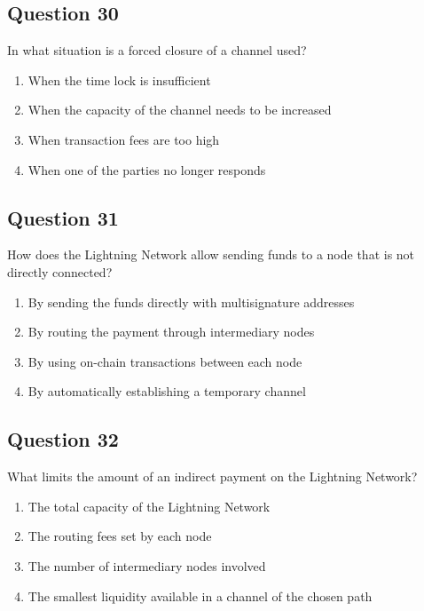 \documentclass[12pt,a4paper]{article}
\begin{document}
\subsection*{Question 30}
In what situation is a forced closure of a channel used?

\begin{enumerate}[label=\Alph*., leftmargin=*]
\item When the time lock is insufficient
\item When the capacity of the channel needs to be increased
\item When transaction fees are too high
\item When one of the parties no longer responds
\end{enumerate}

\bigskip


\subsection*{Question 31}
How does the Lightning Network allow sending funds to a node that is not directly connected?

\begin{enumerate}[label=\Alph*., leftmargin=*]
\item By sending the funds directly with multisignature addresses
\item By routing the payment through intermediary nodes
\item By using on-chain transactions between each node
\item By automatically establishing a temporary channel
\end{enumerate}

\bigskip


\subsection*{Question 32}
What limits the amount of an indirect payment on the Lightning Network?

\begin{enumerate}[label=\Alph*., leftmargin=*]
\item The total capacity of the Lightning Network
\item The routing fees set by each node
\item The number of intermediary nodes involved
\item The smallest liquidity available in a channel of the chosen path
\end{enumerate}
\end{document}
